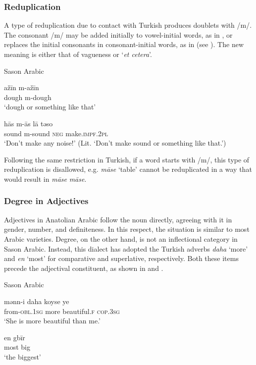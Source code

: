 \documentclass[output=paper]{langsci/langscibook}
\begin{document}
\subsubsection{Reduplication}

A type of reduplication due to contact with Turkish produces doublets with /m/. The consonant /m/ may be added initially to vowel-initial words, as in , or replaces the initial consonants in consonant-initial words, as in  (see \citealt{Akkus2017,Lahdo2009}). The new meaning is either that of vagueness or `\textit{et cetera}'.

\begin{exe}
\ex \label{redup} Sason Arabic
		\begin{xlist}
		\ex \label{redup1}\gll a\v{z}\={i}n m-a\v{z}\={i}n\\
        dough m-dough\\
        \glt `dough or something like that'


	\ex \label{redup2} \gll h\={a}s m-\={a}s l\={a} təso \\
        sound m-sound \textsc{neg} make.\textsc{impf.2pl}\\
        \glt `Don't make any noise!' (Lit. `Don't make sound or something like that.') %
		\end{xlist}
\end{exe}

\noindent Following the same restriction in Turkish, if a word starts with /m/, this type of reduplication is disallowed, e.g. \textit{m\={a}se} `table' cannot be reduplicated in a way that would result in \textit{m\={a}se} \textit{m\={a}se}. 


\subsubsection{Degree in Adjectives} 
Adjectives in Anatolian Arabic follow the noun directly, agreeing with it in gender, number, and definiteness. In this respect, the situation is similar to most Arabic varieties. Degree, on the other hand, is not an inflectional category in Sason Arabic. Instead, this dialect has adopted the Turkish adverbs \textit{daha} `more' and \textit{en} `most' for comparative and superlative, respectively. Both these items precede the adjectival constituent, as shown in  and .

\begin{exe}
\ex \label{adj} Sason Arabic 
		\begin{xlist}
		\ex \label{adj1}\gll mənn-i daha koyse ye\\
   from-\textsc{obl.1sg} more beautiful.\textsc{f} \textsc{cop.3sg} \\
        \glt `She is more beautiful than me.'


	\ex \label{adj2} \gll en gbīr  \\
        most big\\
        \glt `the biggest'
		\end{xlist}
\end{exe}
\end{document}
